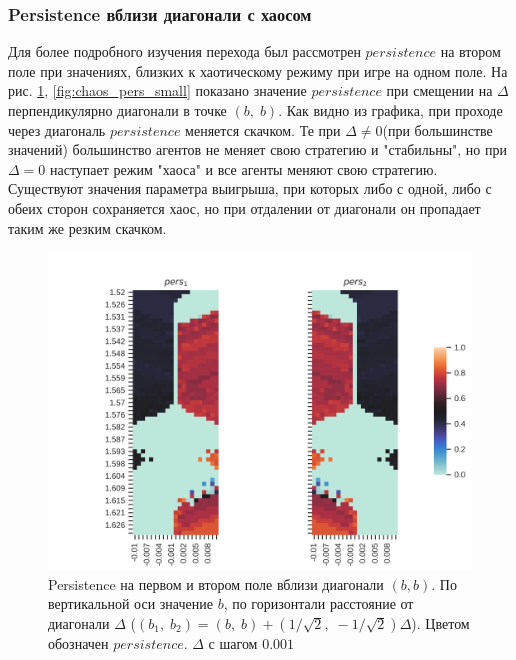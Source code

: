 \documentclass[12pt]{article}
\begin{document}
        \subsubsection{Persistence вблизи диагонали с хаосом}
        Для более подробного изучения перехода был рассмотрен $persistence$ на втором поле при значениях, близких к хаотическому режиму при игре на одном поле. На рис. \ref{fig:chaos_pers}, \ref{fig:chaos_pers_small} показано значение $persistence$ при смещении на $\Delta$ перпендикулярно диагонали в точке $(b,\;b)$. Как видно из графика, при проходе через диагональ $persistence$ меняется скачком. Те при $\Delta\neq0$(при большинстве значений) большинство агентов не меняет свою стратегию и "стабильны", но при $\Delta=0$ наступает режим "хаоса" и все агенты меняют свою стратегию. Существуют значения параметра выигрыша, при которых либо с одной, либо с обеих сторон сохраняется хаос, но при отдалении от диагонали он пропадает таким же резким скачком.
        \begin{figure}[H]
            \centering
            \includegraphics[width=0.95\columnwidth, keepaspectratio=True]{DoubleField/double_field_persistence_diag.jpg}
            \caption{Persistence на первом и втором поле вблизи диагонали $(b, b)$. По вертикальной оси значение $b$, по горизонтали расстояние от диагонали $\Delta$ ($(b_1,\;b_2) = (b,\;b) + (1/\sqrt{2},\;-1/\sqrt{2})\Delta$). Цветом обозначен $persistence$. $\Delta$ с шагом $0.001$}
            \label{fig:chaos_pers}
        \end{figure}
\end{document}
